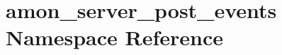 \hypertarget{namespaceamon__server__post__events}{\section{amon\-\_\-server\-\_\-post\-\_\-events Namespace Reference}
\label{namespaceamon__server__post__events}
}
